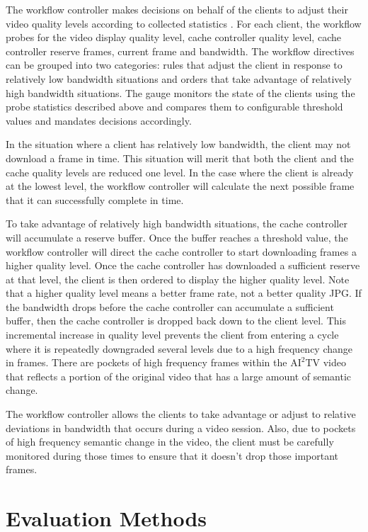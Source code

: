 \documentclass{sig-alternate}
\begin{document}
The workflow controller makes decisions on behalf of the clients to
adjust their video quality levels according to collected statistics .
For each client, the workflow probes for the video display quality
level, cache controller quality level, cache controller reserve
frames, current frame and bandwidth.  The workflow directives can be
grouped into two categories: rules that adjust the client in response
to relatively low bandwidth situations and orders that take advantage
of relatively high bandwidth situations.  The gauge monitors the state
of the clients using the probe statistics described above and compares
them to configurable threshold values and mandates decisions
accordingly.

In the situation where a client has relatively low bandwidth, the
client may not download a frame in time.  This situation will merit
that both the client and the cache quality levels are reduced one
level.  In the case where the client is already at the lowest level,
the workflow controller will calculate the next possible frame that it
can successfully complete in time.

To take advantage of relatively high bandwidth situations, the cache
controller will accumulate a reserve buffer.  Once the buffer reaches
a threshold value, the workflow controller will direct the cache
controller to start downloading frames a higher quality level.  Once
the cache controller has downloaded a sufficient reserve at that
level, the client is then ordered to display the higher quality level.
Note that a higher quality level means a better frame rate, not a
better quality JPG.  If the bandwidth drops before the cache
controller can accumulate a sufficient buffer, then the cache
controller is dropped back down to the client level.  This incremental
increase in quality level prevents the client from entering a cycle
where it is repeatedly downgraded several levels due to a high
frequency change in frames.  There are pockets of high frequency
frames within the $\mathrm{AI}^2$TV video that reflects a portion of
the original video that has a large amount of semantic change.

The workflow controller allows the clients to take advantage or adjust
to relative deviations in bandwidth that occurs during a video
session.  Also, due to pockets of high frequency semantic change in
the video, the client must be carefully monitored during those times
to ensure that it doesn't drop those important frames.

\section{Evaluation Methods} \label{eval}
\end{document}
